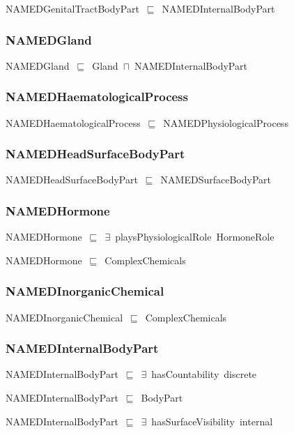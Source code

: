 \documentclass{article}
\begin{document}
NAMEDGenitalTractBodyPart~\ensuremath{\sqsubseteq}~NAMEDInternalBodyPart~

\subsubsection*{NAMEDGland}

NAMEDGland~\ensuremath{\sqsubseteq}~Gland~\ensuremath{\sqcap}~NAMEDInternalBodyPart~

\subsubsection*{NAMEDHaematologicalProcess}

NAMEDHaematologicalProcess~\ensuremath{\sqsubseteq}~NAMEDPhysiologicalProcess~

\subsubsection*{NAMEDHeadSurfaceBodyPart}

NAMEDHeadSurfaceBodyPart~\ensuremath{\sqsubseteq}~NAMEDSurfaceBodyPart~

\subsubsection*{NAMEDHormone}

NAMEDHormone~\ensuremath{\sqsubseteq}~\ensuremath{\exists}~playsPhysiologicalRole~HormoneRole~

NAMEDHormone~\ensuremath{\sqsubseteq}~ComplexChemicals~

\subsubsection*{NAMEDInorganicChemical}

NAMEDInorganicChemical~\ensuremath{\sqsubseteq}~ComplexChemicals~

\subsubsection*{NAMEDInternalBodyPart}

NAMEDInternalBodyPart~\ensuremath{\sqsubseteq}~\ensuremath{\exists}~hasCountability~discrete~

NAMEDInternalBodyPart~\ensuremath{\sqsubseteq}~BodyPart~

NAMEDInternalBodyPart~\ensuremath{\sqsubseteq}~\ensuremath{\exists}~hasSurfaceVisibility~internal~
\end{document}
